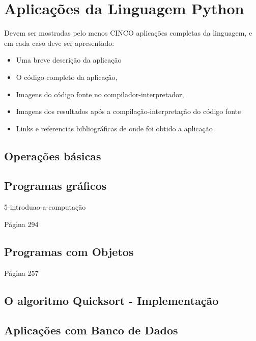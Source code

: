 


\chapter{ Aplica\c{c}\~{o}es da Linguagem Python}

Devem ser mostradas pelo menos CINCO aplica\c{c}\~{o}es completas da linguagem, e em cada caso deve ser apresentado:
\begin{itemize}
  \item Uma breve descri\c{c}\~{a}o da aplica\c{c}\~{a}o
  \item O c\'{o}digo completo da aplica\c{c}\~{a}o,
  \item Imagens do c\'{o}digo fonte no compilador-interpretador,
  \item Imagens dos resultados ap\'{o}s a compila\c{c}\~{a}o-interpreta\c{c}\~{a}o do c\'{o}digo fonte
  \item Links e referencias bibliogr\'{a}ficas de onde foi obtido a aplica\c{c}\~{a}o
\end{itemize}




    \section{Opera\c{c}\~{o}es b\'{a}sicas}


    \section{Programas gr\'{a}ficos}
	5-introduao-a-computação 
	
	Página 294

    \section{Programas com Objetos}
		Página 257
		
    \section{O algoritmo Quicksort - Implementa\c{c}\~{a}o}

	
    \section{Aplica\c{c}\~{o}es com Banco de Dados}

